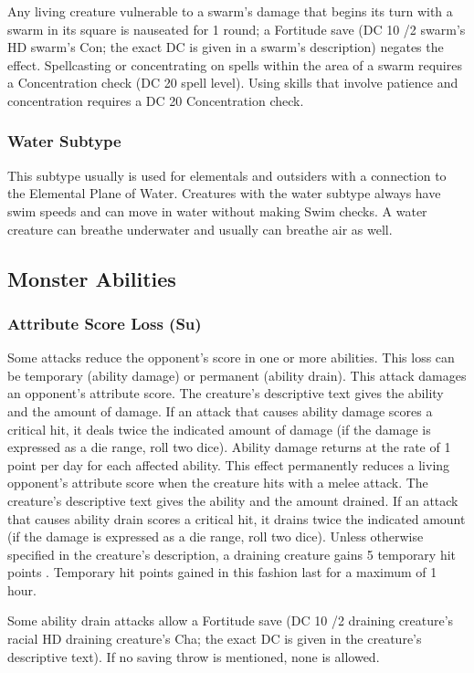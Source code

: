 { Any living creature vulnerable to a swarm's damage that begins its turn with a swarm in its square is nauseated for 1 round; a Fortitude save (DC 10 /2 swarm's HD \add swarm's Con; the exact DC is given in a swarm's description) negates the effect. Spellcasting or concentrating on spells within the area of a swarm requires a Concentration check (DC 20 \add {} spell level). Using skills that involve patience and concentration requires a DC 20 Concentration check.

\subsubsection{Water Subtype} This subtype usually is used for elementals and outsiders with a connection to the Elemental Plane of Water. Creatures with the water subtype always have swim speeds and can move in water without making Swim checks. A water creature can breathe underwater and usually can breathe air as well.

\subsection{Monster Abilities}

\subsubsection{Attribute Score Loss (Su)} Some attacks reduce the opponent's score in one or more abilities. This loss can be temporary (ability damage) or permanent (ability drain).
 This attack damages an opponent's attribute score. The creature's descriptive text gives the ability and the amount of damage. If an attack that causes ability damage scores a critical hit, it deals twice the indicated amount of damage (if the damage is expressed as a die range, roll two dice). Ability damage returns at the rate of 1 point per day for each affected ability.
 This effect permanently reduces a living opponent's attribute score when the creature hits with a melee attack. The creature's descriptive text gives the ability and the amount drained. If an attack that causes ability drain scores a critical hit, it drains twice the indicated amount (if the damage is expressed as a die range, roll two dice). Unless otherwise specified in the creature's description, a draining creature gains 5 temporary hit points . Temporary hit points gained in this fashion last for a maximum of 1 hour.
\par Some ability drain attacks allow a Fortitude save (DC 10 /2 draining creature's racial HD \add draining creature's Cha; the exact DC is given in the creature's descriptive text). If no saving throw is mentioned, none is allowed.

}
